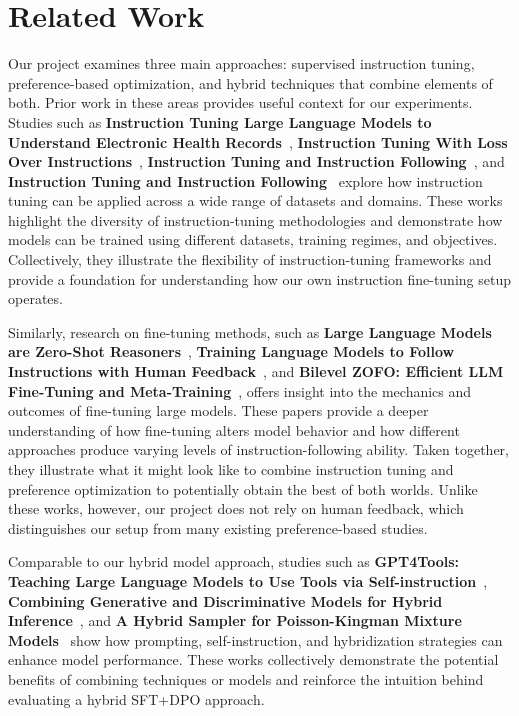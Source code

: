 \documentclass[11pt,a4paper]{article}
\begin{document}
\section{Related Work}

Our project examines three main approaches: supervised instruction tuning, preference-based optimization, and hybrid techniques that combine elements of both. Prior work in these areas provides useful context for our experiments. Studies such as \textbf{Instruction Tuning Large Language Models to Understand Electronic Health Records}~\cite{wu2024ehr}, \textbf{Instruction Tuning With Loss Over Instructions}~\cite{shi2024loss}, \textbf{Instruction Tuning and Instruction Following}~\cite{wu2024instruction}, and \textbf{Instruction Tuning and Instruction Following}~\cite{ye2023instruction} explore how instruction tuning can be applied across a wide range of datasets and domains. These works highlight the diversity of instruction-tuning methodologies and demonstrate how models can be trained using different datasets, training regimes, and objectives. Collectively, they illustrate the flexibility of instruction-tuning frameworks and provide a foundation for understanding how our own instruction fine-tuning setup operates.

Similarly, research on fine-tuning methods, such as \textbf{Large Language Models are Zero-Shot Reasoners}~\cite{kojima2022zeroshot}, \textbf{Training Language Models to Follow Instructions with Human Feedback}~\cite{ouyang2022training}, and \textbf{Bilevel ZOFO: Efficient LLM Fine-Tuning and Meta-Training}~\cite{shirkavand2025bilevelzofo}, offers insight into the mechanics and outcomes of fine-tuning large models. These papers provide a deeper understanding of how fine-tuning alters model behavior and how different approaches produce varying levels of instruction-following ability. Taken together, they illustrate what it might look like to combine instruction tuning and preference optimization to potentially obtain the best of both worlds. Unlike these works, however, our project does not rely on human feedback, which distinguishes our setup from many existing preference-based studies.

Comparable to our hybrid model approach, studies such as \textbf{GPT4Tools: Teaching Large Language Models to Use Tools via Self-instruction}~\cite{yang2023gpt4tools}, \textbf{Combining Generative and Discriminative Models for Hybrid Inference}~\cite{satorras2019combining}, and \textbf{A Hybrid Sampler for Poisson-Kingman Mixture Models}~\cite{lomeli2015hybrid} show how prompting, self-instruction, and hybridization strategies can enhance model performance. These works collectively demonstrate the potential benefits of combining techniques or models and reinforce the intuition behind evaluating a hybrid SFT+DPO approach.
\end{document}

